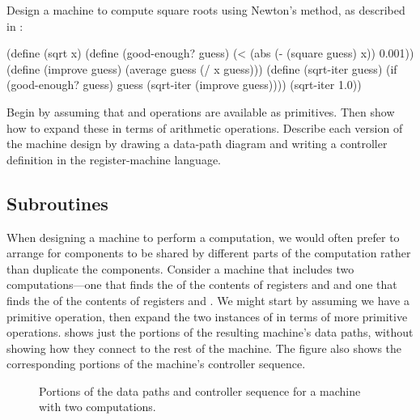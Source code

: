 \begin{exercise}
	\label{Exercise 5.3}
	Design a machine to compute square roots using Newton’s method, as described in :
	\begin{scheme}
	  (define (sqrt x)
	    (define (good-enough? guess)
	      (< (abs (- (square guess) x)) 0.001))
	    (define (improve guess)
	      (average guess (/ x guess)))
	    (define (sqrt-iter guess)
	      (if (good-enough? guess)
	          guess
	          (sqrt-iter (improve guess))))
	    (sqrt-iter 1.0))
	\end{scheme}
	Begin by assuming that  and  operations are available as primitives.
	Then show how to expand these in terms of arithmetic operations.
	Describe each version of the  machine design by drawing a data-path diagram and writing a controller definition in the register-machine language.
\end{exercise}



\subsection{Subroutines}
\label{Section 5.1.3}

When designing a machine to perform a computation, we would often prefer to arrange for components to be shared by different parts of the computation rather than duplicate the components.
Consider a machine that includes two  computations---one that finds the  of the contents of registers  and  and one that finds the  of the contents of registers  and .
We might start by assuming we have a primitive  operation, then expand the two instances of  in terms of more primitive operations.
 shows just the  portions of the resulting machine’s data paths, without showing how they connect to the rest of the machine.
The figure also shows the corresponding portions of the machine’s controller sequence.

\begin{figure}[tb]
	\centering
	
	\caption{
		Portions of the data paths and controller sequence for a machine with two  computations.
	}
	\label{Figure 5.7}
\end{figure}

